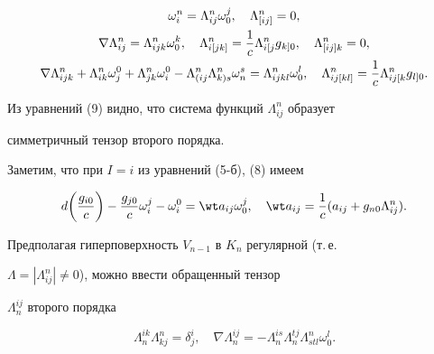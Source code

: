 \begin{gather} 


\omega^n_i=\Lambda^n_{ij}\omega^j_0,\quad \Lambda^n_{[ij]}=0,\\ 


% 


\nabla\Lambda^n_{ij}=\Lambda^n_{ijk}\omega^k_0,\quad 


\Lambda^n_{i[jk]}=\frac{1}{c}\Lambda{}^n_{i[j}g{}_{k]0},\quad 


\Lambda^n_{[ij]k}=0,\\ 


% 


\nabla\Lambda^n_{ijk}+\Lambda^n_{ik}\omega^0_j+ 


\Lambda^n_{jk}\omega^0_i-\Lambda{}^n_{(ij}\Lambda{}^n_{k)s} 


\omega^s_n=\Lambda^n_{ijkl}\omega^l_0,\quad 


\Lambda^n_{ij[kl]}=\frac{1}{c}\Lambda{}^n_{ij[k} 


g{}_{l]0}.\notag 


\end{gather} 


Из уравнений (9) видно, что система функций $\Lambda^n_{ij}$ образует 


симметричный тензор второго порядка. 


 


Заметим, что при $I=i$ из уравнений (5-б), (8) имеем 


$$ 


d\bigg(\frac{g_{i0}}{c} \bigg)-\frac{g_{j0}}{c}\omega^j_i- 


\omega^0_i=\wt a_{ij}\omega^j_0,\quad \wt a_{ij}=\frac{1}{c} 


(a_{ij}+g_{n0}\Lambda^n_{ij}). 


$$ 


 


Предполагая гиперповерхность $V_{n-1}$ в $K_n$ регулярной (т.\,е. 


$\Lambda=|\Lambda^n_{ij}|\ne0$), можно ввести обращенный тензор 


$\Lambda^{ij}_n$ второго порядка 


\begin{equation} 


\Lambda^{ik}_n\Lambda^n_{kj}=\delta^i_j,\quad 


\nabla\Lambda^{ij}_n=-\Lambda^{is}_n\Lambda^{tj}_n 


\Lambda^n_{stl}\omega^l_0. 


\end{equation} 


